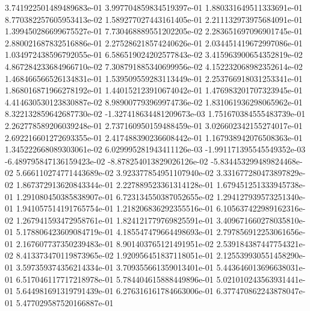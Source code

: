 3.741922501489489683e-01	3.997704859834519397e-01	1.880331649511333691e-01	8.770382257605953413e-02	1.589277027443161405e-01	2.211132973975684091e-01	1.399450286699675527e-01	7.730468889551202205e-02	2.283651697096901745e-01	2.880021687832516886e-01	2.275286218574240626e-01	2.034451419672997086e-01	1.034972438596792055e-01	6.586519024202577843e-02	3.415963900654352819e-02	4.867284233684966710e-02	7.308791885340699956e-02	4.152232068982352614e-02	1.468466566526134831e-01	1.539509559283113449e-01	2.253766918031253341e-01	1.868016871966278192e-01	1.440152123910674042e-01	1.476983201707323945e-01	4.414630530123830887e-02	8.989007793969974736e-02	1.831061936298065962e-01	8.322132859642687730e-02	-1.327418634481209673e-03	1.751670384555483739e-01	2.262778589206039248e-01	2.737160950159488459e-01	3.026602342155274017e-01	2.692216601272693355e-01	2.417488390236608442e-01	1.167938942076508363e-01	1.345222668089303061e-02	6.029995281943411126e-03	-1.991171395545549352e-03	-6.489795847136159423e-02	-8.878254013829026126e-02	-5.834453299489824468e-02	5.666110274771443689e-02	3.923377854951107940e-02	3.331677280473897829e-02	1.867372913620843344e-01	2.227889523361314128e-01	1.679451251333945738e-01	1.291080450385838907e-01	6.723134550387052655e-02	1.294127939573251340e-01	1.941057514191765754e-01	1.218206836292355516e-01	6.105637422989162316e-02	1.267941593472958761e-01	1.824121779769825591e-01	3.409671660278035810e-01	5.178806423609084719e-01	4.185547479664498693e-01	2.797856912253061656e-01	2.167607737350239483e-01	8.901403765121491951e-02	2.539184387447754321e-02	8.413373470119873965e-02	1.920956451837118051e-01	2.125539930551458290e-01	3.597359374356214334e-01	3.709355661359013401e-01	5.443646013696638031e-01	6.517046117717218978e-01	5.784404615888449896e-01	5.021010243563931441e-01	5.644981691319791439e-01	6.276316161784663006e-01	6.377470862243878047e-01	5.477029587520166887e-01
